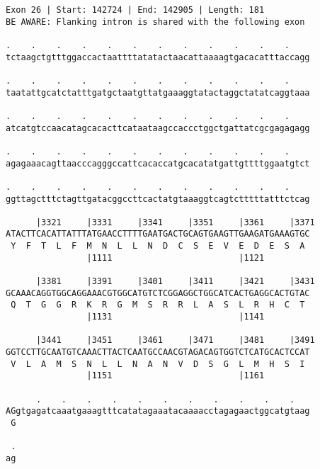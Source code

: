 \documentclass{article}
\begin{document}
\begin{Verbatim}[fontfamily=courier]
Exon 26 | Start: 142724 | End: 142905 | Length: 181
BE AWARE: Flanking intron is shared with the following exon

.    .    .    .    .    .    .    .    .    .    .    .    
tctaagctgtttggaccactaattttatatactaacattaaaagtgacacatttaccagg

.    .    .    .    .    .    .    .    .    .    .    .    
taatattgcatctatttgatgctaatgttatgaaaggtatactaggctatatcaggtaaa

.    .    .    .    .    .    .    .    .    .    .    .    
atcatgtccaacatagcacacttcataataagccaccctggctgattatcgcgagagagg

.    .    .    .    .    .    .    .    .    .    .    .    
agagaaacagttaacccagggccattcacaccatgcacatatgattgttttggaatgtct

.    .    .    .    .    .    .    .    .    .    .    .    
ggttagctttctagttgatacggccttcactatgtaaaggtcagtctttttatttctcag

      |3321     |3331     |3341     |3351     |3361     |3371
ATACTTCACATTATTTATGAACCTTTTGAATGACTGCAGTGAAGTTGAAGATGAAAGTGC
 Y  F  T  L  F  M  N  L  L  N  D  C  S  E  V  E  D  E  S  A 
                |1111                         |1121         

      |3381     |3391     |3401     |3411     |3421     |3431
GCAAACAGGTGGCAGGAAACGTGGCATGTCTCGGAGGCTGGCATCACTGAGGCACTGTAC
 Q  T  G  G  R  K  R  G  M  S  R  R  L  A  S  L  R  H  C  T 
                |1131                         |1141         

      |3441     |3451     |3461     |3471     |3481     |3491
GGTCCTTGCAATGTCAAACTTACTCAATGCCAACGTAGACAGTGGTCTCATGCACTCCAT
 V  L  A  M  S  N  L  L  N  A  N  V  D  S  G  L  M  H  S  I 
                |1151                         |1161         

      .    .    .    .    .    .    .    .    .    .    .   
AGgtgagatcaaatgaaagtttcatatagaaatacaaaacctagagaactggcatgtaag
 G                                                          

 .
ag
\end{Verbatim}
\newpage
\end{document}
